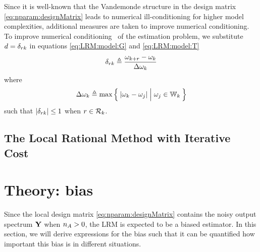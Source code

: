 

Since it is well-known that the Vandemonde structure in the design matrix \eqref{eq:nparam:designMatrix} leads to numerical ill-conditioning for higher model complexities, additional measures are taken to improve numerical conditioning.
To improve numerical conditioning~\citep{Pintelon2005} of the estimation problem, we substitute $d = \delta_{rk}$ in equations \eqref{eq:LRM:model:G} and \eqref{eq:LRM:model:T}
\begin{equation}
\delta_{rk} \triangleq \frac{\omega_{k+r} - \omega_k}{\Delta \omega_k}
\label{eq:freqScaling}
\end{equation}
where
\begin{equation}
  \Delta \omega_k \isdef
  \max
  \Set{
    \abs{ \omega_k - \omega_j} |  \vphantom{\frac{a}{b}}  \omega_j \in \LocalWindow[k]
  }
\end{equation}
such that $\left| \delta_{rk} \right| \leq 1$ when $r \in \mathcal{R}_{k}$.

\subsection{The Local Rational Method with Iterative Cost}



\section{Theory: bias}
\label{sec:biascalc}
Since the local design matrix \eqref{eq:nparam:designMatrix} contains the noisy output spectrum $\mathbf{Y}$ when $n_{A} > 0$, the \gls{LRM} is expected to be a biased estimator.
In this section, we will derive expressions for the bias such that it can be quantified how important this bias is in different situations.


